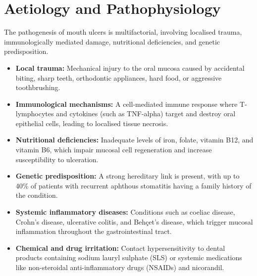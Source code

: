 \section*{Aetiology and Pathophysiology}
The pathogenesis of mouth ulcers is multifactorial, involving localised trauma, immunologically mediated damage, nutritional deficiencies, and genetic predisposition.
\begin{itemize}
    \item \textbf{Local trauma:} Mechanical injury to the oral mucosa caused by accidental biting, sharp teeth, orthodontic appliances, hard food, or aggressive toothbrushing.
    \item \textbf{Immunological mechanisms:} A cell-mediated immune response where T-lymphocytes and cytokines (such as TNF-alpha) target and destroy oral epithelial cells, leading to localised tissue necrosis.
    \item \textbf{Nutritional deficiencies:} Inadequate levels of iron, folate, vitamin B12, and vitamin B6, which impair mucosal cell regeneration and increase susceptibility to ulceration.
    \item \textbf{Genetic predisposition:} A strong hereditary link is present, with up to 40\% of patients with recurrent aphthous stomatitis having a family history of the condition.
    \item \textbf{Systemic inflammatory diseases:} Conditions such as coeliac disease, Crohn's disease, ulcerative colitis, and Behçet's disease, which trigger mucosal inflammation throughout the gastrointestinal tract.
    \item \textbf{Chemical and drug irritation:} Contact hypersensitivity to dental products containing sodium lauryl sulphate (SLS) or systemic medications like non-steroidal anti-inflammatory drugs (NSAIDs) and nicorandil.
\end{itemize}

